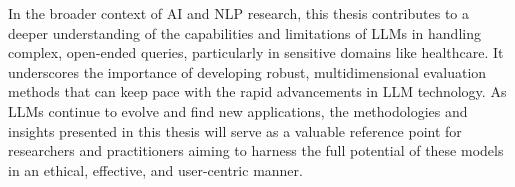 In the broader context of AI and NLP research, this thesis contributes to a deeper understanding of the capabilities and limitations of LLMs in handling complex, open-ended queries, particularly in sensitive domains like healthcare.
It underscores the importance of developing robust, multidimensional evaluation methods that can keep pace with the rapid advancements in LLM technology.
As LLMs continue to evolve and find new applications, the methodologies and insights presented in this thesis will serve as a valuable reference point for researchers and practitioners aiming to harness the full potential of these models in an ethical, effective, and user-centric manner.